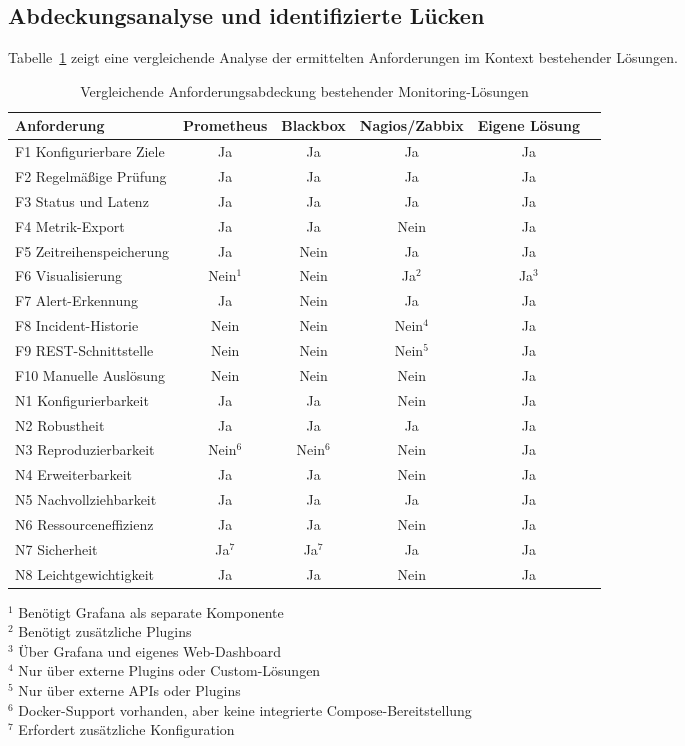 \subsection{Abdeckungsanalyse und identifizierte Lücken}
\label{subsec:abdeckungsanalyse}

Tabelle~\ref{tab:anforderungsabdeckung} zeigt eine vergleichende Analyse der ermittelten Anforderungen im Kontext bestehender Lösungen.

\begin{table}[h]
\centering
\caption{Vergleichende Anforderungsabdeckung bestehender Monitoring-Lösungen}
\label{tab:anforderungsabdeckung}
\begin{tabular}{lccccc}
\hline
\textbf{Anforderung} & \textbf{Prometheus} & \textbf{Blackbox} & \textbf{Nagios/Zabbix} & \textbf{Eigene Lösung} \\
\hline
F1 Konfigurierbare Ziele & Ja & Ja & Ja & Ja \\
F2 Regelmäßige Prüfung & Ja & Ja & Ja & Ja \\
F3 Status und Latenz & Ja & Ja & Ja & Ja \\
F4 Metrik-Export & Ja & Ja & Nein & Ja \\
F5 Zeitreihenspeicherung & Ja & Nein & Ja & Ja \\
F6 Visualisierung & Nein$^{1}$ & Nein & Ja$^{2}$ & Ja$^{3}$ \\
F7 Alert-Erkennung & Ja & Nein & Ja & Ja \\
F8 Incident-Historie & Nein & Nein & Nein$^{4}$ & Ja \\
F9 REST-Schnittstelle & Nein & Nein & Nein$^{5}$ & Ja \\
F10 Manuelle Auslösung & Nein & Nein & Nein & Ja \\
\hline
N1 Konfigurierbarkeit & Ja & Ja & Nein & Ja \\
N2 Robustheit & Ja & Ja & Ja & Ja \\
N3 Reproduzierbarkeit & Nein$^{6}$ & Nein$^{6}$ & Nein & Ja \\
N4 Erweiterbarkeit & Ja & Ja & Nein & Ja \\
N5 Nachvollziehbarkeit & Ja & Ja & Ja & Ja \\
N6 Ressourceneffizienz & Ja & Ja & Nein & Ja \\
N7 Sicherheit & Ja$^{7}$ & Ja$^{7}$ & Ja & Ja \\
N8 Leichtgewichtigkeit & Ja & Ja & Nein & Ja \\
\hline
\end{tabular}
\begin{flushleft}
\footnotesize
$^{1}$ Benötigt Grafana als separate Komponente \\
$^{2}$ Benötigt zusätzliche Plugins \\
$^{3}$ Über Grafana und eigenes Web-Dashboard \\
$^{4}$ Nur über externe Plugins oder Custom-Lösungen \\
$^{5}$ Nur über externe APIs oder Plugins \\
$^{6}$ Docker-Support vorhanden, aber keine integrierte Compose-Bereitstellung \\
$^{7}$ Erfordert zusätzliche Konfiguration
\end{flushleft}
\end{table}

